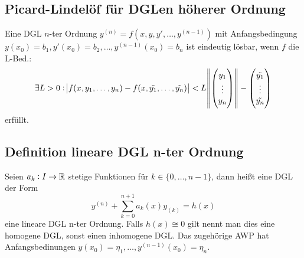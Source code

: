 \subsection{Picard-Lindelöf für DGLen höherer Ordnung}
Eine DGL $n$-ter Ordnung $y^{(n)} = f(x, y, y', \ldots, y^{(n-1)})$ mit Anfangsbedingung 
$y(x_0) = b_1, y'(x_0) = b_2, \ldots, y^{(n-1)}(x_0) = b_n$ ist eindeutig lösbar, wenn $f$ die L-Bed.:
\begin{equation*}
	\exists L > 0: \abs{f(x, y_1, \ldots, y_n) - f(x, \tilde{y_1}, \ldots, \tilde{y_n})} < L
	\norm{\begin{pmatrix}
		y_1 \\ \vdots \\ y_n
	\end{pmatrix}} -
	\begin{pmatrix}
		\tilde{y_1} \\ \vdots \\ \tilde{y_n}
	\end{pmatrix}
\end{equation*}
erfüllt.

\subsection{Definition lineare DGL n-ter Ordnung}
Seien $a_k: I \to \mathbb{R}$ stetige Funktionen für $k\in \{0, \ldots, n-1\}$, dann heißt eine DGL der Form
\begin{equation*}
	y^{(n)} + \sum_{k=0}^{n+1} a_k(x) y_{(k)} = h(x)
\end{equation*}
eine lineare DGL n-ter Ordnung. Falls $h(x) \cong 0$ gilt nennt man dies eine homogene DGL, sonst einen inhomogene DGL.
Das zugehörige AWP hat Anfangsbedinungen $y(x_0) = \eta_1, \ldots, y^{(n-1)}(x_0) = \eta_n$.

